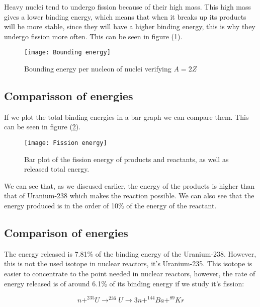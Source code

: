 \documentclass{article} %
\begin{document}
Heavy nuclei tend to undergo fission because of their high mass. This high mass gives a lower binding energy, which means that when it breaks up its products will be more stable, since they will have a higher binding energy, this is why they undergo fission more often. This can be seen in figure (\ref{fig:BindingE}).

\begin{figure}[h!]
\begin{center}
\texttt{[image: Bounding energy]}
\caption{Bounding energy per nucleon of nuclei verifying $A = 2Z$}
\label{fig:BindingE}
\end{center}
\end{figure}

\subsection{Comparisson of energies}

If we plot the total binding energies in a bar graph we can compare them. This can be seen in figure (\ref{fig:ECompar}).

\begin{figure}[h!]
\begin{center}
\texttt{[image: Fission energy]}
\caption{Bar plot of the fission energy of products and reactants, as well as released total energy.}
\label{fig:ECompar}
\end{center}
\end{figure}

We can see that, as we discused earlier, the energy of the products is higher than that of Uranium-238 which makes the reaction possible. We can also see that the energy produced is in the order of 10\% of the energy of the reactant.

\subsection{Comparison of energies}

The energy released is 7.81\% of the binding energy of the Uranium-238. However, this is not the used isotope in nuclear reactors, it's Uranium-235. This isotope is easier to concentrate to the point needed in nuclear reactors, however, the rate of energy released is of around 6.1\% of its binding energy if we study it's fission:

$$
n + ^{235}U \rightarrow ^{236}U \rightarrow 3n + ^{144}Ba + ^{89}Kr
$$
\end{document}
